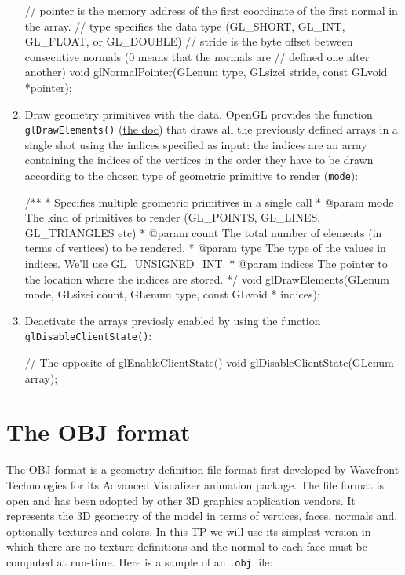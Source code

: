 \documentclass[a4paper,11pt]{article}
\newcommand{\hilight}[1]{\colorbox{bg}{#1}}
\newcommand{\coden}[1]{\texttt{#1}}
\newcommand{\code}[1]{\hilight{\texttt{#1}}}
\newcommand{\brand}[1]{\textsf{#1}\xspace}
\newcommand{\opengl}{\brand{OpenGL}}
\newcommand{\obj}{\brand{OBJ}}
\begin{document}
\begin{enumerate}
{\begin{cppcode}
// pointer is the memory address of the first coordinate of the first normal in the array. 
// type specifies the data type (GL_SHORT, GL_INT, GL_FLOAT, or GL_DOUBLE) 
// stride is the byte offset between consecutive normals (0 means that the normals are 
// defined one after another)
void glNormalPointer(GLenum type, GLsizei stride, const GLvoid *pointer);
\end{cppcode}
}
	\item Draw geometry primitives with the data. \opengl provides the function \coden{glDrawElements()} (\href{https://www.opengl.org/sdk/docs/man/html/glDrawElements.xhtml}{the doc}) that draws all the previously defined arrays in a single shot using the indices specified as input: the indices are an array containing the indices of the vertices in the order they have to be drawn according to the chosen type of geometric primitive to render (\code{mode}):\\
{\smaller
\begin{cppcode}
/**
 * Specifies multiple geometric primitives in a single call
 * @param mode The kind of primitives to render (GL_POINTS, GL_LINES, GL_TRIANGLES etc)
 * @param count The total number of elements (in terms of vertices) to be rendered.
 * @param type The type of the values in indices. We'll use GL_UNSIGNED_INT.
 * @param indices The pointer to the location where the indices are stored.
 */
void glDrawElements(GLenum mode, GLsizei count, GLenum type, const GLvoid * indices);
\end{cppcode}
}
	
	\item Deactivate the arrays previosly enabled by using the function \coden{glDisableClientState()}:\\

{\smaller
\begin{cppcode} 
// The opposite of glEnableClientState()
void glDisableClientState(GLenum array);
\end{cppcode}
}


\end{enumerate}



\section{The OBJ format}

The \obj format is a geometry definition file format first developed by \brand{Wavefront Technologies} for its \brand{Advanced Visualizer} animation package. The file format is open and has been adopted by other 3D graphics application vendors. It represents the 3D geometry of the model in terms of vertices, faces, normals and, optionally textures and colors. In this TP we will use its simplest version in which there are no texture definitions and the normal to each face must be computed at run-time. Here is a sample of an \coden{.obj} file:\\
\end{document}
